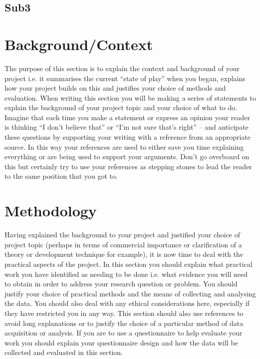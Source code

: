 \documentclass[a4paper, 12pt]{article}
\begin{document}
\subsection{Sub3}



\pagebreak


\section{Background/Context} %
The purpose of this section is to explain the context and background of your project i.e. it summarises the current “state of play” when you began, explains how your project builds on this and justifies your choice of methods and evaluation. When writing this section you will be making a series of statements to explain the background of your project topic and your choice of what to do. Imagine that each time you make a statement or express an opinion your reader is thinking “I don’t believe that” or “I’m not sure that’s right” – and anticipate these questions by supporting your writing with a reference from an appropriate source. In this way your references are used to either save you time explaining everything or are being used to support your arguments. Don’t go overboard on this but certainly try to use your references as stepping stones to lead the reader to the same position that you got to.

\pagebreak


\section{Methodology} %
Having explained the background to your project and justified your choice of project topic (perhaps in terms of commercial importance or clarification of a theory or development technique for example), it is now time to deal with the practical aspects of the project. In this section you should explain what practical work you have identified as needing to be done i.e. what evidence you will need to obtain in order to address your research question or problem. You should justify your choice of practical methods and the means of collecting and analysing the data. You should also deal with any ethical considerations here, especially if they have restricted you in any way. This section should also use references to avoid long explanations or to justify the choice of a particular method of data acquisition or analysis. If you are to use a questionnaire to help evaluate your work you should explain your questionnaire design and how the data will be collected and evaluated in this section.
\end{document}
